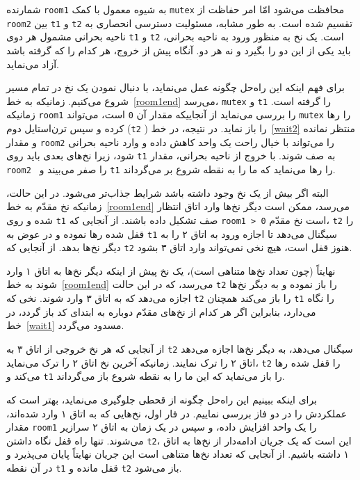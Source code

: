 \documentclass{book}
\begin{document}
    شمارنده  {\tt room1}  به شیوه معمول با کمک {\tt mutex} محافظت می‌شود امّا امر حفاظت از {\tt room2} 
    بین {\tt t1} و {\tt t2} تقسیم شده است. به طور مشابه، مسئولیت دسترسی انحصاری به ناحیه بحرانی مشمول هر دوی {\tt t1} و {\tt t2} است. 
    یک نخ به منظور ورود به ناحیه بحرانی،  باید یکی از این دو را بگیرد و نه هر دو. آنگاه پیش از خروج، هر کدام را که گرفته باشد آزاد می‌نماید. 

    برای فهم اینکه این راه‌حل چگونه عمل می‌نماید، با دنبال نمودن یک نخ در تمام مسیر شروع می‌کنیم. 
    زمانیکه به خط~\ref{room1end} می‌رسد، {\tt mutex} و {\tt t1} 
     را گرفته است. زمانیکه {\tt room1}  را بررسی می‌نماید از آنجاییکه مقدار آن {\tt 0} است، 
    می‌تواند {\tt mutex} را رها کرده و سپس ترن‌استایل دوم ({\tt t2} ) را باز نماید. در نتیجه، در خط~\ref{wait2} منتظر نمانده 
    و مقدار {\tt room2} را  می‌تواند  با خیال راحت 
    یک واحد کاهش داده  و وارد ناحیه بحرانی شود، زیرا نخ‌های بعدی باید روی  {\tt t1} به صف شوند. 
    با خروج از ناحیه بحرانی، مقدار  {\tt room2 } را صفر می‌بیند و {\tt t1} را رها می‌نماید که ما را به نقطه شروع بر می‌گرداند. 

    البته اگر بیش از یک نخ وجود داشته باشد شرایط جذاب‌تر می‌شود. 
    در این حالت، زمانیکه نخ مقدّم به خط~\ref{room1end} می‌رسد، ممکن است دیگر نخ‌ها 
    وارد اتاق انتظار شده  و روی  {\tt t1} صف تشکیل داده باشند. از آنجایی که {\tt room1 > 0} است نخ مقدّم، {\tt t2} 
    را قفل شده رها نموده و در عوض به {\tt t1} سیگنال می‌دهد 
    تا اجازه ورود به اتاق ۲ را به دیگر نخ‌ها بدهد. از آنجایی که {\tt t2} هنوز قفل است، هیچ نخی نمی‌تواند وارد اتاق ۳ بشود. 

    نهایتاً (چون تعداد نخ‌ها متناهی است)، یک نخ پیش از اینکه دیگر نخ‌ها به اتاق ۱ وارد شوند به خط~\ref{room1end} می‌رسد، 
    که در این حالت {\tt t2}
    را باز نموده و به دیگر نخ‌ها اجازه می‌دهد که به اتاق ۳ وارد شوند. نخی که  {\tt t2}  را باز می‌کند همچنان  {\tt t1} را نگاه می‌دارد، بنابراین 
    اگر هر کدام از نخ‌های مقدّم دوباره به ابتدای کد باز گردد، در خط~\ref{wait1} مسدود می‌گردد. 

    از آنجایی که هر نخ خروجی از اتاق ۳ به  {\tt t2} سیگنال می‌دهد،  به دیگر نخ‌ها اجازه می‌دهد اتاق ۲ را ترک نمایند. 
    زمانیکه آخرین نخ اتاق ۲ را ترک می‌نماید، {\tt t2}  را قفل شده رها می‌کند و  {\tt t1} را باز می‌نماید که این ما را به نقطه شروع باز می‌گرداند. 


    برای اینکه ببینیم این راه‌حل چگونه از قحطی جلوگیری می‌نماید، بهتر است که عملکردش را در دو فاز بررسی نماییم. 
    در فار اول، نخ‌هایی که به اتاق ۱ وارد شده‌اند، مقدار {\tt room1} را یک واحد افزایش داده، و سپس در یک زمان به اتاق ۲ سرازیر می‌شوند. 
    تنها راه قفل نگاه داشتن  {\tt t2}، این است که یک جریان ادامه‌دار از نخ‌ها به اتاق ۱ داشته باشیم. 
    از آنجایی که تعداد نخ‌ها متناهی است این جریان نهایتاً پایان می‌پذیرد و در آن نقطه {\tt t1} قفل مانده و  {\tt t2} باز می‌شود. 
    
\end{document}
